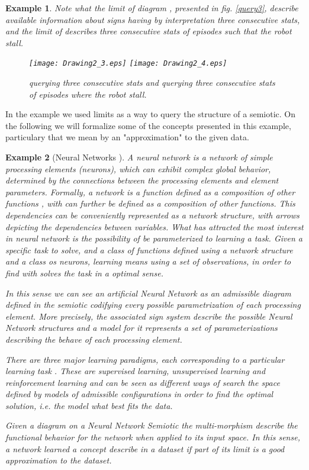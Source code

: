 \documentclass[oribibl]{llncs}
\newtheorem{exam}{Example}
\begin{document}
\begin{exam}
Note what the limit of diagram , presented in fig. \ref{query3}, describe available information about signs having by interpretation three consecutive stats, and the limit of  describes three consecutive stats of episodes such that the robot stall.

\begin{figure}[h]
    \begin{center}
    \texttt{[image: Drawing2\_3.eps]}
    \texttt{[image: Drawing2\_4.eps]}
    \end{center}
    \caption{ querying three consecutive stats and  querying three consecutive stats of episodes where the robot stall.}\label{query4}
\end{figure}
\end{exam}

In the example we used limits as a way to query the structure of a semiotic. On the following we will formalize some of the concepts presented in this example, particulary that we mean by an "approximation" to the given data.

\begin{exam}[Neural Networks \cite{Michell86}]
A neural network is a network of simple processing elements (neurons), which can exhibit complex global behavior, determined by the connections between the processing elements and element parameters.  Formally, a network is a function  defined as a composition of other functions , with can further be defined as a composition of other functions. This dependencies can be conveniently represented as a network structure, with arrows depicting the dependencies between variables. What has attracted the most interest in neural network is the possibility of be parameterized to learning a task. Given a specific task to solve, and a class of functions  defined using a network structure and a class os neurons, learning means using a set of observations, in order to find  with solves the task in a optimal sense.

In this sense we can see an artificial Neural Network as an admissible diagram defined in the semiotic codifying  every possible parametrization of each processing element. More precisely, the associated sign system describe the possible Neural Network structures and a model for it represents a set of parameterizations describing the behave of each processing element.

There are three major learning paradigms, each corresponding to a particular learning task \cite{Bishop96}. These are supervised learning, unsupervised learning and reinforcement learning and can be seen as different ways of search the space defined by models of admissible configurations in order to find the optimal solution, i.e. the model what best fits the data.

Given a diagram  on a Neural Network Semiotic the multi-morphism  describe the functional behavior for the network  when applied to its input space. In this sense, a network  learned a concept describe in a dataset if part of its limit  is a good approximation to the dataset.
\end{exam}
\end{document}

